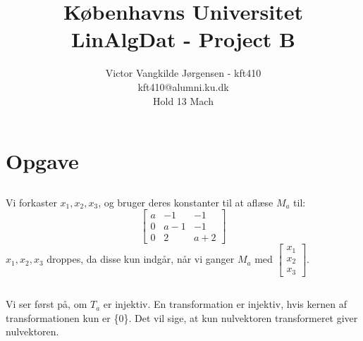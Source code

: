 \documentclass[a4paper,12pt]{article}
\title{Københavns Universitet\\
LinAlgDat - Project B}
\author{Victor Vangkilde Jørgensen - kft410\\ 
kft410@alumni.ku.dk\\
Hold 13 Mach}
\begin{document}
 
 
\maketitle 

\section[Opgave]{Opgave}
\subsection{}

Vi forkaster $x_1, x_2, x_3$, og bruger deres konstanter til at aflæse $M_a$ til:\\
\[
\left[\begin{array}{ccc}
    a & -1 & -1 \\
    0 & a-1 & -1 \\
    0 & 2 & a+2
\end{array}\right]
\]
$x_1, x_2, x_3$ droppes, da disse kun indgår, når vi ganger $M_a$ med $\left[\begin{array}{ccc|c}
    x_1 \\
    x_2 \\
    x_3
\end{array}\right]$.



\subsection{}
Vi ser først på, om $T_a$ er injektiv. En transformation er injektiv, hvis kernen af transformationen kun er \{0\}. Det vil sige, at kun nulvektoren transformeret giver nulvektoren.\\
\end{document}
